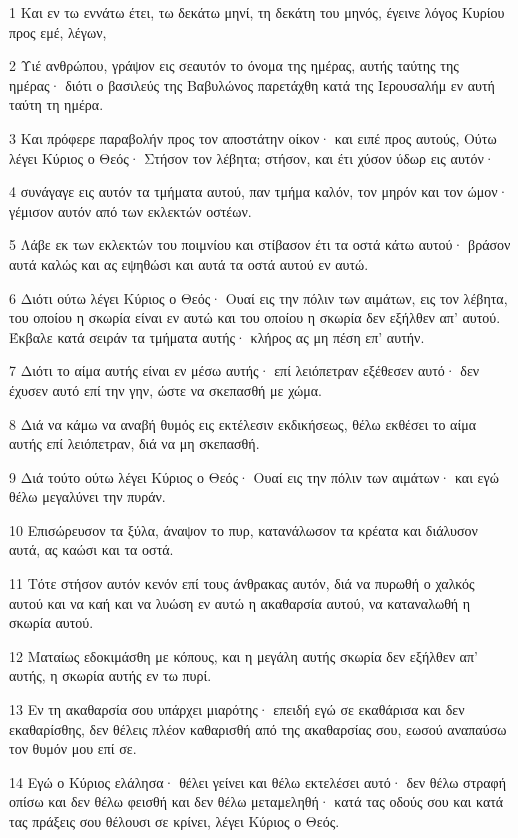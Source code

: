 \par 1 Και εν τω εννάτω έτει, τω δεκάτω μηνί, τη δεκάτη του μηνός, έγεινε λόγος Κυρίου προς εμέ, λέγων,
\par 2 Υιέ ανθρώπου, γράψον εις σεαυτόν το όνομα της ημέρας, αυτής ταύτης της ημέρας· διότι ο βασιλεύς της Βαβυλώνος παρετάχθη κατά της Ιερουσαλήμ εν αυτή ταύτη τη ημέρα.
\par 3 Και πρόφερε παραβολήν προς τον αποστάτην οίκον· και ειπέ προς αυτούς, Ούτω λέγει Κύριος ο Θεός· Στήσον τον λέβητα; στήσον, και έτι χύσον ύδωρ εις αυτόν·
\par 4 συνάγαγε εις αυτόν τα τμήματα αυτού, παν τμήμα καλόν, τον μηρόν και τον ώμον· γέμισον αυτόν από των εκλεκτών οστέων.
\par 5 Λάβε εκ των εκλεκτών του ποιμνίου και στίβασον έτι τα οστά κάτω αυτού· βράσον αυτά καλώς και ας εψηθώσι και αυτά τα οστά αυτού εν αυτώ.
\par 6 Διότι ούτω λέγει Κύριος ο Θεός· Ουαί εις την πόλιν των αιμάτων, εις τον λέβητα, του οποίου η σκωρία είναι εν αυτώ και του οποίου η σκωρία δεν εξήλθεν απ' αυτού. Έκβαλε κατά σειράν τα τμήματα αυτής· κλήρος ας μη πέση επ' αυτήν.
\par 7 Διότι το αίμα αυτής είναι εν μέσω αυτής· επί λειόπετραν εξέθεσεν αυτό· δεν έχυσεν αυτό επί την γην, ώστε να σκεπασθή με χώμα.
\par 8 Διά να κάμω να αναβή θυμός εις εκτέλεσιν εκδικήσεως, θέλω εκθέσει το αίμα αυτής επί λειόπετραν, διά να μη σκεπασθή.
\par 9 Διά τούτο ούτω λέγει Κύριος ο Θεός· Ουαί εις την πόλιν των αιμάτων· και εγώ θέλω μεγαλύνει την πυράν.
\par 10 Επισώρευσον τα ξύλα, άναψον το πυρ, κατανάλωσον τα κρέατα και διάλυσον αυτά, ας καώσι και τα οστά.
\par 11 Τότε στήσον αυτόν κενόν επί τους άνθρακας αυτόν, διά να πυρωθή ο χαλκός αυτού και να καή και να λυώση εν αυτώ η ακαθαρσία αυτού, να καταναλωθή η σκωρία αυτού.
\par 12 Ματαίως εδοκιμάσθη με κόπους, και η μεγάλη αυτής σκωρία δεν εξήλθεν απ' αυτής, η σκωρία αυτής εν τω πυρί.
\par 13 Εν τη ακαθαρσία σου υπάρχει μιαρότης· επειδή εγώ σε εκαθάρισα και δεν εκαθαρίσθης, δεν θέλεις πλέον καθαρισθή από της ακαθαρσίας σου, εωσού αναπαύσω τον θυμόν μου επί σε.
\par 14 Εγώ ο Κύριος ελάλησα· θέλει γείνει και θέλω εκτελέσει αυτό· δεν θέλω στραφή οπίσω και δεν θέλω φεισθή και δεν θέλω μεταμεληθή· κατά τας οδούς σου και κατά τας πράξεις σου θέλουσι σε κρίνει, λέγει Κύριος ο Θεός.
